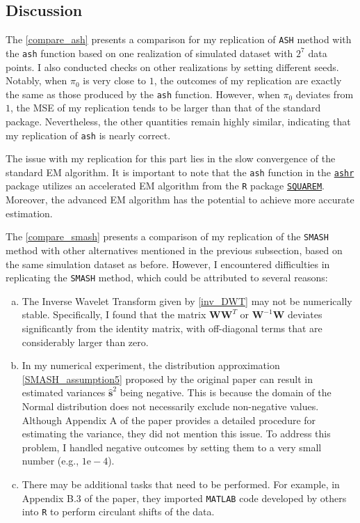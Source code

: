 \documentclass[11pt]{article}
\begin{document}
\subsection{Discussion}
The \autoref{compare_ash} presents a comparison for my replication of \verb|ASH| method with the \verb|ash| function based on one realization of simulated dataset with $2^7$ data points. I also conducted checks on other realizations by setting different seeds. Notably, when $\pi_0$ is very close to $1$, the outcomes of my replication are exactly the same as those produced by the \verb|ash| function. However, when $\pi_0$ deviates from $1$, the MSE of my replication tends to be larger than that of the standard package. Nevertheless, the other quantities remain highly similar, indicating that my replication of \verb|ash| is nearly correct.

The issue with my replication for this part lies in the slow convergence of the standard EM algorithm. It is important to note that the \verb|ash| function in the \href{https://cran.r-project.org/web/packages/ashr/ashr.pdf}{\texttt{ashr}} package utilizes an accelerated EM algorithm from the \verb|R| package \href{https://cran.r-project.org/web/packages/SQUAREM/index.html}{\texttt{SQUAREM}}. Moreover, the advanced EM algorithm has the potential to achieve more accurate estimation.

The \autoref{compare_smash} presents a comparison of my replication of the \verb|SMASH| method with other alternatives mentioned in the previous subsection, based on the same simulation dataset as before. However, I encountered difficulties in replicating the \verb|SMASH| method, which could be attributed to several reasons:
\begin{enumerate}[a)]
\item The Inverse Wavelet Transform given by \eqref{inv_DWT} may not be numerically stable. Specifically, I found that the matrix $\mathbf{W}\mathbf{W}^T$ or $\mathbf{W}^{-1}\mathbf{W}$ deviates significantly from the identity matrix, with off-diagonal terms that are considerably larger than zero.
\item In my numerical experiment, the distribution approximation \eqref{SMASH_assumption5} proposed by the original paper can result in estimated variances $\hat{{\boldsymbol{s}}}^2$ being negative. This is because the domain of the Normal distribution does not necessarily exclude non-negative values. Although Appendix A of the paper provides a detailed procedure for estimating the variance, they did not mention this issue. To address this problem, I handled negative outcomes by setting them to a very small number (e.g., $1\text{e}-4$).
\item There may be additional tasks that need to be performed. For example, in Appendix B.3 of the paper, they imported \verb|MATLAB| code developed by others into \verb|R| to perform circulant shifts of the data.
\end{enumerate} 
\end{document}
